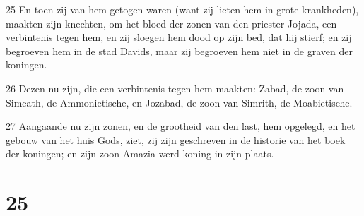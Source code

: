 \par 25 En toen zij van hem getogen waren (want zij lieten hem in grote krankheden), maakten zijn knechten, om het bloed der zonen van den priester Jojada, een verbintenis tegen hem, en zij sloegen hem dood op zijn bed, dat hij stierf; en zij begroeven hem in de stad Davids, maar zij begroeven hem niet in de graven der koningen.
\par 26 Dezen nu zijn, die een verbintenis tegen hem maakten: Zabad, de zoon van Simeath, de Ammonietische, en Jozabad, de zoon van Simrith, de Moabietische.
\par 27 Aangaande nu zijn zonen, en de grootheid van den last, hem opgelegd, en het gebouw van het huis Gods, ziet, zij zijn geschreven in de historie van het boek der koningen; en zijn zoon Amazia werd koning in zijn plaats.

\chapter{25}

